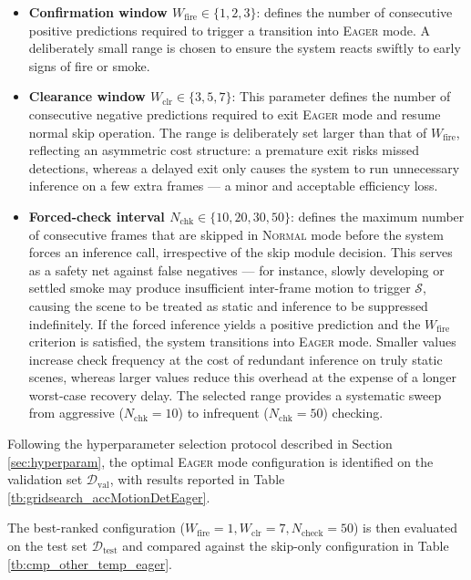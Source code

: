 \documentclass[
  10pt,
]{article}
\begin{document}
\begin{itemize}
\item
  \textbf{Confirmation window \(W_{\mathrm{fire}} \in \{1, 2, 3\}\)}:
  defines the number of consecutive positive predictions required to
  trigger a transition into \textsc{Eager} mode. A deliberately small
  range is chosen to ensure the system reacts swiftly to early signs of
  fire or smoke.
\item
  \textbf{Clearance window \(W_{\mathrm{clr}} \in \{3, 5, 7\}\)}: This
  parameter defines the number of consecutive negative predictions
  required to exit \textsc{Eager} mode and resume normal skip operation.
  The range is deliberately set larger than that of
  \(W_{\mathrm{fire}}\), reflecting an asymmetric cost structure: a
  premature exit risks missed detections, whereas a delayed exit only
  causes the system to run unnecessary inference on a few extra frames
  --- a minor and acceptable efficiency loss.
\item
  \textbf{Forced-check interval
  \(N_{\mathrm{chk}} \in \{10, 20, 30, 50\}\)}: defines the maximum
  number of consecutive frames that are skipped in \textsc{Normal} mode
  before the system forces an inference call, irrespective of the skip
  module decision. This serves as a safety net against false negatives
  --- for instance, slowly developing or settled smoke may produce
  insufficient inter-frame motion to trigger \(\mathcal{S}\), causing
  the scene to be treated as static and inference to be suppressed
  indefinitely. If the forced inference yields a positive prediction and
  the \(W_{\mathrm{fire}}\) criterion is satisfied, the system
  transitions into \textsc{Eager} mode. Smaller values increase check
  frequency at the cost of redundant inference on truly static scenes,
  whereas larger values reduce this overhead at the expense of a longer
  worst-case recovery delay. The selected range provides a systematic
  sweep from aggressive (\(N_{\mathrm{chk}} = 10\)) to infrequent
  (\(N_{\mathrm{chk}} = 50\)) checking.
\end{itemize}

Following the hyperparameter selection protocol described in Section
\ref{sec:hyperparam}, the optimal \textsc{Eager} mode configuration is
identified on the validation set \(\mathcal{D}_{\mathrm{val}}\), with
results reported in Table \ref{tb:gridsearch_accMotionDetEager}.

The best-ranked configuration
(\(W_{\text{fire}} = 1, W_{\text{clr}} = 7, N_{\text{check}} = 50\)) is
then evaluated on the test set \(\mathcal{D}_{\text{test}}\) and
compared against the skip-only configuration in Table
\ref{tb:cmp_other_temp_eager}.
\end{document}
